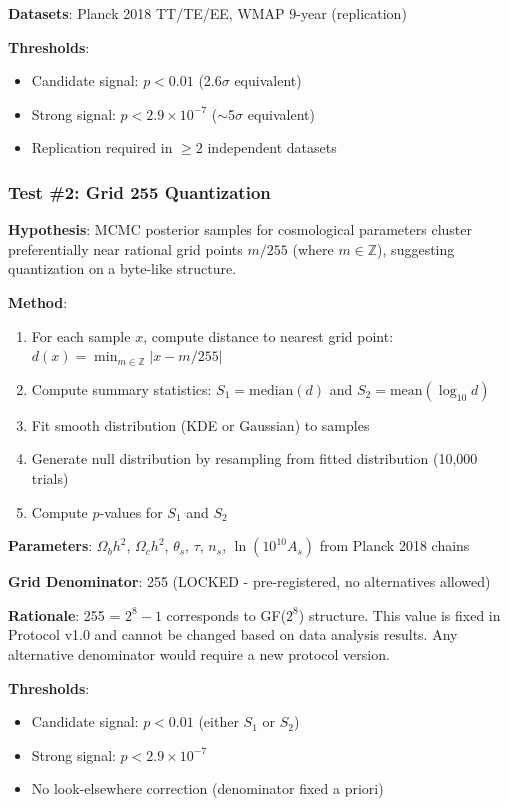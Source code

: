 \textbf{Datasets}: Planck 2018 TT/TE/EE, WMAP 9-year (replication)

\textbf{Thresholds}:
\begin{itemize}
    \item Candidate signal: $p < 0.01$ (2.6$\sigma$ equivalent)
    \item Strong signal: $p < 2.9 \times 10^{-7}$ ($\sim$5$\sigma$ equivalent)
    \item Replication required in $\geq 2$ independent datasets
\end{itemize}

\subsubsection{Test \#2: Grid 255 Quantization}

\textbf{Hypothesis}: MCMC posterior samples for cosmological parameters cluster preferentially near rational grid points $m/255$ (where $m \in \mathbb{Z}$), suggesting quantization on a byte-like structure.

\textbf{Method}:
\begin{enumerate}
    \item For each sample $x$, compute distance to nearest grid point: $d(x) = \min_{m \in \mathbb{Z}} |x - m/255|$
    \item Compute summary statistics: $S_1 = \text{median}(d)$ and $S_2 = \text{mean}(\log_{10} d)$
    \item Fit smooth distribution (KDE or Gaussian) to samples
    \item Generate null distribution by resampling from fitted distribution (10,000 trials)
    \item Compute $p$-values for $S_1$ and $S_2$
\end{enumerate}

\textbf{Parameters}: $\Omega_b h^2$, $\Omega_c h^2$, $\theta_s$, $\tau$, $n_s$, $\ln(10^{10} A_s)$ from Planck 2018 chains

\textbf{Grid Denominator}: 255 (LOCKED - pre-registered, no alternatives allowed)

\textbf{Rationale}: 255 = $2^8 - 1$ corresponds to GF($2^8$) structure. This value is fixed in Protocol v1.0 and cannot be changed based on data analysis results. Any alternative denominator would require a new protocol version.

\textbf{Thresholds}:
\begin{itemize}
    \item Candidate signal: $p < 0.01$ (either $S_1$ or $S_2$)
    \item Strong signal: $p < 2.9 \times 10^{-7}$
    \item No look-elsewhere correction (denominator fixed a priori)
\end{itemize}

